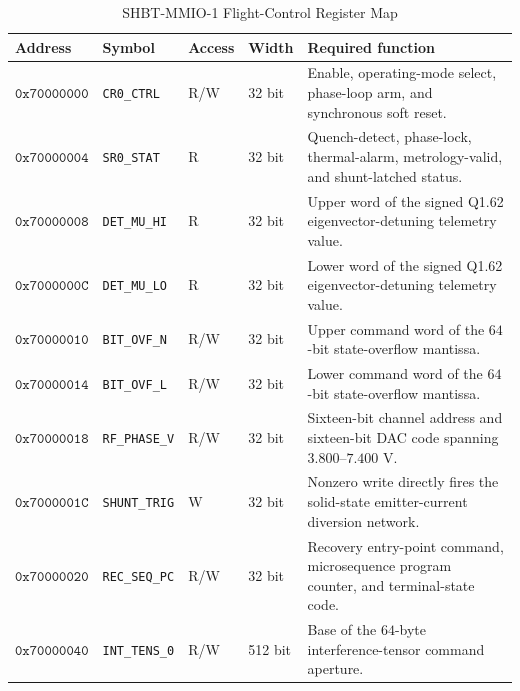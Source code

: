 \documentclass[10pt,twocolumn]{IEEEtran}
\begin{document}
\begin{table}[t]
\caption{SHBT-MMIO-1 Flight-Control Register Map}
\label{tab:mmio}
\centering
\footnotesize
\begin{tabular}{@{}llllp{8.0cm}@{}}
\toprule
Address & Symbol & Access & Width & Required function \\
\midrule
$\mathtt{0x70000000}$ & \texttt{CR0\_CTRL} & R/W & 32 bit & Enable, operating-mode select, phase-loop arm, and synchronous soft reset. \\
$\mathtt{0x70000004}$ & \texttt{SR0\_STAT} & R & 32 bit & Quench-detect, phase-lock, thermal-alarm, metrology-valid, and shunt-latched status. \\
$\mathtt{0x70000008}$ & \texttt{DET\_MU\_HI} & R & 32 bit & Upper word of the signed Q1.62 eigenvector-detuning telemetry value. \\
$\mathtt{0x7000000C}$ & \texttt{DET\_MU\_LO} & R & 32 bit & Lower word of the signed Q1.62 eigenvector-detuning telemetry value. \\
$\mathtt{0x70000010}$ & \texttt{BIT\_OVF\_N} & R/W & 32 bit & Upper command word of the $64$-bit state-overflow mantissa. \\
$\mathtt{0x70000014}$ & \texttt{BIT\_OVF\_L} & R/W & 32 bit & Lower command word of the $64$-bit state-overflow mantissa. \\
$\mathtt{0x70000018}$ & \texttt{RF\_PHASE\_V} & R/W & 32 bit & Sixteen-bit channel address and sixteen-bit DAC code spanning $3.800$--$7.400$ V. \\
$\mathtt{0x7000001C}$ & \texttt{SHUNT\_TRIG} & W & 32 bit & Nonzero write directly fires the solid-state emitter-current diversion network. \\
$\mathtt{0x70000020}$ & \texttt{REC\_SEQ\_PC} & R/W & 32 bit & Recovery entry-point command, microsequence program counter, and terminal-state code. \\
$\mathtt{0x70000040}$ & \texttt{INT\_TENS\_0} & R/W & 512 bit & Base of the $64$-byte interference-tensor command aperture. \\
\bottomrule
\end{tabular}
\end{table}
\end{document}
